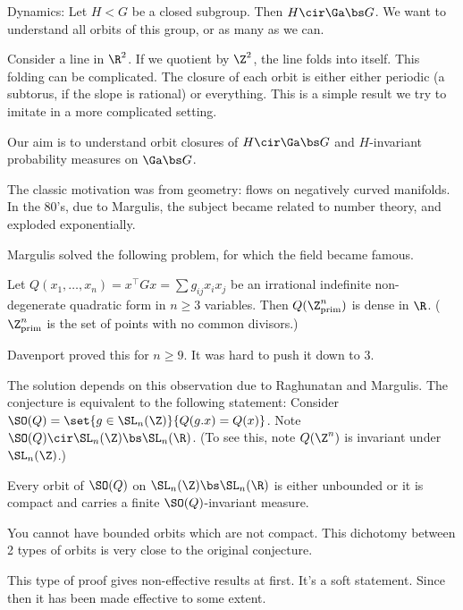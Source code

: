 Dynamics: Let $H<G$ be a closed subgroup. Then $H\cir \Ga \bs G$. 
We want to understand all orbits of this group, or as many as we can.

Consider a line in $\R^2$. If we quotient by $\Z^2$, the line folds into itself. This folding can be complicated. The closure of each orbit is either either periodic (a subtorus, if the slope is rational) or everything. This is a simple result we try to imitate in a more complicated setting.

Our aim is to understand orbit closures of $H \cir \Ga \bs G$ and $H$-invariant probability measures on $\Ga\bs G$. 

The classic motivation was from geometry: flows on negatively curved manifolds. In the 80's, due to Margulis, the subject became related to number theory, and exploded exponentially.

Margulis solved the following problem, for which the field became famous.
\begin{conj}[Oppenheim]
Let $Q(x_1,\ldots, x_n) = x^\top Gx = \sum g_{ij}x_ix_j$ be an irrational indefinite non-degenerate quadratic form in $n\ge 3$ variables.
Then $Q(\Z^n_{\text{prim}})$ is dense in $\R$. ($\Z^n_{\text{prim}}$ is the set of points with no common divisors.)
\end{conj}
Davenport proved this for $n\ge 9$. It was hard to push it down to 3. 

The solution depends on this observation due to Raghunatan and Margulis. The conjecture is equivalent to the following statement:
Consider $\SO(Q) = \set{g\in \SL_n(\Z
)}{Q(g.x) = Q(x)}$. Note $\SO(Q)\cir \SL_n(\Z) \bs \SL_n(\R)$. 
(To see this, note $Q(\Z^n)$ is invariant under $\SL_n(\Z)$.)
\begin{conj}
Every orbit of $\SO(Q)$ on $\SL_n(\Z)\bs \SL_n(\R)$ is either unbounded or it is compact and carries a finite $\SO(Q)$-invariant measure. 
\end{conj}
You cannot have bounded orbits which are not compact. This dichotomy between 2 types of orbits is very close to the original conjecture.

This type of proof gives non-effective results at first. It's a soft statement. Since then it has been made effective to some extent.


